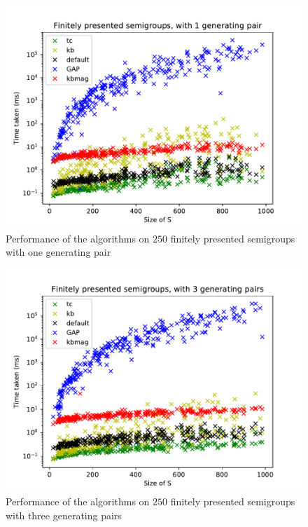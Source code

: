 \begin{figure}[h]
  \centering
  \includegraphics[width=\textwidth]{pics/ch-pairs/bench-fp-1p-times}
  \caption[Benchmark: all algorithms, finitely presented, 1 pair]
  {Performance of the algorithms on $250$ finitely presented semigroups
    with one generating pair}
  \label{fig:bench-fp-1p-times}
\end{figure}

\begin{figure}[h]
  \centering
  \includegraphics[width=\textwidth]{pics/ch-pairs/bench-fp-3p-times}
  \caption[Benchmark: all algorithms, finitely presented, 3 pairs]
  {Performance of the algorithms on $250$ finitely presented semigroups
    with three generating pairs}
  \label{fig:bench-fp-3p-times}
\end{figure}

